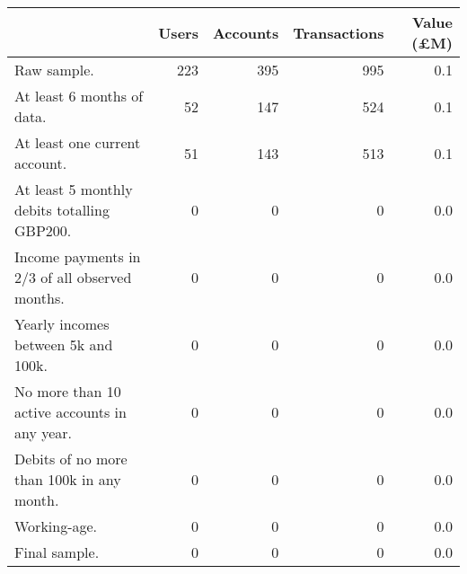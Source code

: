 \begin{tabular}{lrrrr}
\toprule
                                               & Users & Accounts & Transactions & Value (\pounds M) \\
\midrule
                                   Raw sample. &   223 &      395 &          995 &               0.1 \\
                    At least 6 months of data. &    52 &      147 &          524 &               0.1 \\
                 At least one current account. &    51 &      143 &          513 &               0.1 \\
   At least 5 monthly debits totalling GBP200. &     0 &        0 &            0 &               0.0 \\
Income payments in 2/3 of all observed months. &     0 &        0 &            0 &               0.0 \\
           Yearly incomes between 5k and 100k. &     0 &        0 &            0 &               0.0 \\
  No more than 10 active accounts in any year. &     0 &        0 &            0 &               0.0 \\
     Debits of no more than 100k in any month. &     0 &        0 &            0 &               0.0 \\
                                  Working-age. &     0 &        0 &            0 &               0.0 \\
                                 Final sample. &     0 &        0 &            0 &               0.0 \\
\bottomrule
\end{tabular}
